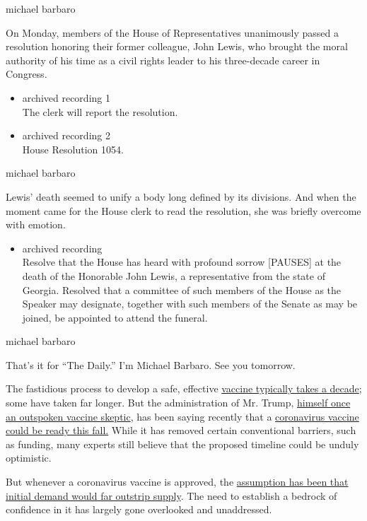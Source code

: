 michael barbaro

On Monday, members of the House of Representatives unanimously passed a
resolution honoring their former colleague, John Lewis, who brought the
moral authority of his time as a civil rights leader to his three-decade
career in Congress.

\begin{itemize}
\item
  archived recording 1\\
  The clerk will report the resolution.
\item
  archived recording 2\\
  House Resolution 1054.
\end{itemize}

michael barbaro

Lewis' death seemed to unify a body long defined by its divisions. And
when the moment came for the House clerk to read the resolution, she was
briefly overcome with emotion.

\begin{itemize}
\tightlist
\item
  archived recording\\
  Resolve that the House has heard with profound sorrow {[}PAUSES{]} at
  the death of the Honorable John Lewis, a representative from the state
  of Georgia. Resolved that a committee of such members of the House as
  the Speaker may designate, together with such members of the Senate as
  may be joined, be appointed to attend the funeral.
\end{itemize}

michael barbaro

That's it for ``The Daily.'' I'm Michael Barbaro. See you tomorrow.

The fastidious process to develop a safe, effective
\href{https://www.nytimes.com/interactive/2020/04/30/opinion/coronavirus-covid-vaccine.html}{vaccine
typically takes a decade}; some have taken far longer. But the
administration of Mr. Trump,
\href{https://www.nytimes.com/2020/03/09/health/trump-vaccines.html}{himself
once an outspoken vaccine skeptic}, has been saying recently that a
\href{https://www.businessinsider.com/trump-expects-covid-19-vaccine-fall-timeline-coronavirus-2020-7}{coronavirus
vaccine could be ready this fall.} While it has removed certain
conventional barriers, such as funding, many experts still believe that
the proposed timeline could be unduly optimistic.

But whenever a coronavirus vaccine is approved, the
\href{https://www.nytimes.com/2020/07/09/us/coronavirus-vaccine.html}{assumption
has been that initial demand would far outstrip supply}. The need to
establish a bedrock of confidence in it has largely gone overlooked and
unaddressed.

